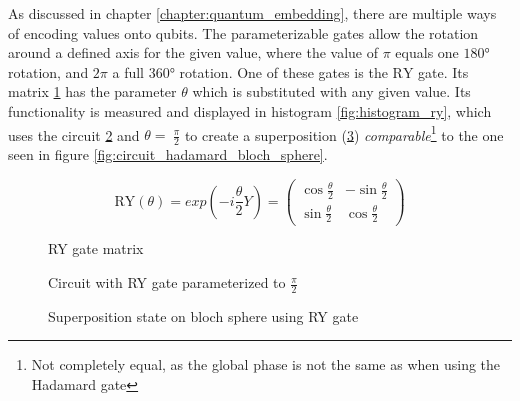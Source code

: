 As discussed in chapter \ref{chapter:quantum_embedding}, there are multiple ways of encoding values onto qubits. The parameterizable gates allow the rotation around a defined axis for the given value, where the value of $\pi$ equals one $180°$ rotation, and $2\pi$ a full $360°$ rotation. One of these gates is the $\mathrm{RY}$ gate\cite{qiskit_rygate_nodate}. Its matrix \ref{fig:matrix_ry} has the parameter $\theta$ which is substituted with any given value. Its functionality is measured and displayed in histogram \ref{fig:histogram_ry}, which uses the circuit \ref{fig:circuit_ry} and $\theta =\ \frac{\pi}{2}$ to create a superposition (\ref{fig:ry_bloch_sphere}) \emph{comparable}\footnote{Not completely equal, as the global phase is not the same as when using the Hadamard gate} to the one seen in figure \ref{fig:circuit_hadamard_bloch_sphere}.

\clearpage



\begin{figure}[!h]
    \centering
    $$
    \mathrm{RY}(\theta) = exp(-i \frac{\theta}{2} Y) =
    \begin{pmatrix}
        \cos{\frac{\theta}{2}} & -\sin{\frac{\theta}{2}} \\
        \sin{\frac{\theta}{2}} & \cos{\frac{\theta}{2}}
    \end{pmatrix}
    $$
    \caption{RY gate matrix}
    \label{fig:matrix_ry}
\end{figure}

\begin{figure}[!h]
    \centering
    \caption{Circuit with RY gate parameterized to $\frac{\pi}{2}$}
    \label{fig:circuit_ry}
\end{figure}

\begin{figure}[!h]
    \centering
    \caption{Superposition state on bloch sphere using RY gate}
    \label{fig:ry_bloch_sphere}
\end{figure}

